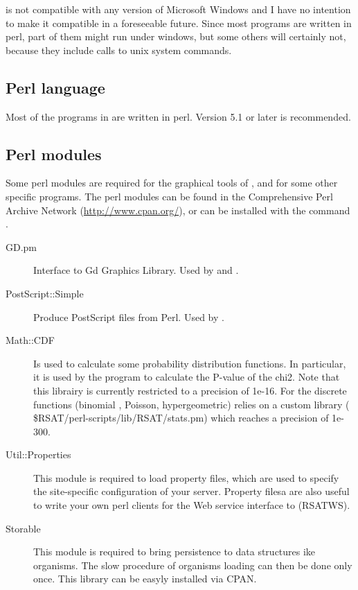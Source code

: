 \documentclass{book}
\begin{document}
\RSAT is not compatible with any version of Microsoft Windows and I
have no intention to make it compatible in a foreseeable future. Since
most programs are written in perl, part of them might run under
windows, but some others will certainly not, because they include
calls to unix system commands.

\subsection{Perl language}

Most of the programs in \RSAT are written in perl. Version 5.1 or
later is recommended.

\subsection{Perl modules}

Some perl modules are required for the graphical tools of \RSAT, and
for some other specific programs. The perl modules can be found in the
Comprehensive Perl Archive Network (\url{http://www.cpan.org/}), or
can be installed with the command .

\begin{description}
\item[GD.pm] Interface to Gd Graphics Library. Used by
   and .

\item[PostScript::Simple] Produce PostScript files from Perl. Used by
  .

\item[Math::CDF] Is used to calculate some probability distribution
  functions. In particular, it is used by the program
   to calculate the P-value of the
  chi2. Note that this librairy is currently restricted to a precision
  of 1e-16. For the discrete functions (binomial , Poisson,
  hypergeometric) \RSAT relies on a custom library (
  \$RSAT/perl-scripts/lib/RSAT/stats.pm) which reaches a precision of
  1e-300.

\item[Util::Properties] This module is required to load property
  files, which are used to specify the site-specific configuration of
  your \RSAT server. Property filesa are also useful to write your own
  perl clients for the Web service interface to \RSAT (RSATWS).

\item[Storable] This module is required to bring persistence to data
  structures ike organisms. The slow procedure of organisms loading
  can then be done only once. This library can be easyly installed via
  CPAN.

\end{description}
\end{document}
